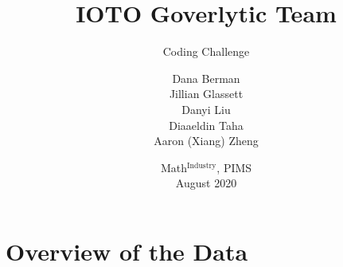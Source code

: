 \documentclass[compress]{beamer}
\title{IOTO Goverlytic Team}
\subtitle{Coding Challenge}
\author[D. Berman, J.Glassett, D. Liu, D. Taha, A.Zheng]{Dana Berman \\Jillian Glassett \\Danyi Liu \\Diaaeldin Taha \\Aaron (Xiang) Zheng }
\date{Math$^{\text{Industry}}$, PIMS\\
August 2020}
\begin{document}
\begin{frame}
  \titlepage
\end{frame}





%   






\section{Overview of the Data}
\end{document}

